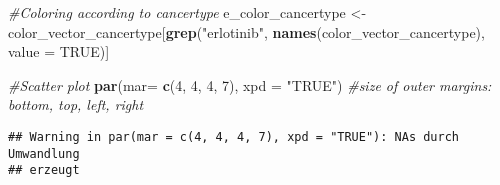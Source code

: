 \documentclass[]{article}
\newenvironment{Shaded}{\begin{snugshade}}{\end{snugshade}}
\newcommand{\CommentTok}[1]{\textcolor[rgb]{0.56,0.35,0.01}{\textit{#1}}}
\newcommand{\DataTypeTok}[1]{\textcolor[rgb]{0.13,0.29,0.53}{#1}}
\newcommand{\DecValTok}[1]{\textcolor[rgb]{0.00,0.00,0.81}{#1}}
\newcommand{\KeywordTok}[1]{\textcolor[rgb]{0.13,0.29,0.53}{\textbf{#1}}}
\newcommand{\NormalTok}[1]{#1}
\newcommand{\OtherTok}[1]{\textcolor[rgb]{0.56,0.35,0.01}{#1}}
\newcommand{\StringTok}[1]{\textcolor[rgb]{0.31,0.60,0.02}{#1}}
\begin{document}
\begin{Shaded}
\begin{Highlighting}[]
\CommentTok{#Coloring according to cancertype}
\NormalTok{e_color_cancertype <-}\StringTok{ }\NormalTok{color_vector_cancertype[}\KeywordTok{grep}\NormalTok{(}\StringTok{"erlotinib"}\NormalTok{, }\KeywordTok{names}\NormalTok{(color_vector_cancertype), }\DataTypeTok{value =} \OtherTok{TRUE}\NormalTok{)]}

\CommentTok{#Scatter plot}
\KeywordTok{par}\NormalTok{(}\DataTypeTok{mar=} \KeywordTok{c}\NormalTok{(}\DecValTok{4}\NormalTok{, }\DecValTok{4}\NormalTok{, }\DecValTok{4}\NormalTok{, }\DecValTok{7}\NormalTok{), }\DataTypeTok{xpd =} \StringTok{"TRUE"}\NormalTok{) }\CommentTok{#size of outer margins: bottom, top, left, right}
\end{Highlighting}
\end{Shaded}

\begin{verbatim}
## Warning in par(mar = c(4, 4, 4, 7), xpd = "TRUE"): NAs durch Umwandlung
## erzeugt
\end{verbatim}
\end{document}
